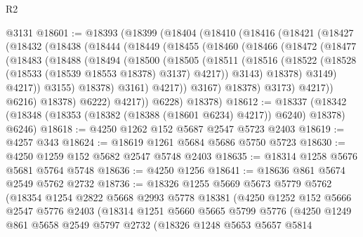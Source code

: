 \begin{lexlean}{R2}
\begin{coremodule}
    @3131
@18601 := @18393
    (@18399
      (@18404
        (@18410
          (@18416
            (@18421
              (@18427
                (@18432
                  (@18438
                    (@18444
                      (@18449
                        (@18455
                          (@18460
                            (@18466
                              (@18472
                                (@18477
                                  (@18483
                                    (@18488
                                      (@18494
                                        (@18500
                                          (@18505
                                            (@18511
                                              (@18516
                                                (@18522
                                                  (@18528
                                                    (@18533 (@18539 @18553 @18378) @3137)
                                                    @4217))
                                                @3143)
                                              @18378)
                                            @3149)
                                          @4217))
                                      @3155)
                                    @18378)
                                  @3161)
                                @4217))
                            @3167)
                          @18378)
                        @3173)
                      @4217))
                  @6216)
                @18378)
              @6222)
            @4217))
        @6228)
      @18378)
@18612 := @18337
    (@18342 (@18348 (@18353 (@18382 (@18388 (@18601 @6234) @4217)) @6240) @18378) @6246)
@18618 := @4250 @1262 @152 @5687 @2547 @5723 @2403
@18619 := @4257 @343
@18624 := @18619 @1261 @5684 @5686 @5750 @5723
@18630 := @4250 @1259 @152 @5682 @2547 @5748 @2403
@18635 := @18314 @1258 @5676 @5681 @5764 @5748
@18636 := @4250 @1256
@18641 := @18636 @861 @5674 @2549 @5762 @2732
@18736 := @18326
    @1255
    @5669
    @5673
    @5779
    @5762
    (@18354
      @1254
      @2822
      @5668
      @2993
      @5778
      @18381
      (@4250
        @1252
        @152
        @5666
        @2547
        @5776
        @2403
        (@18314
          @1251
          @5660
          @5665
          @5799
          @5776
          (@4250
            @1249
            @861
            @5658
            @2549
            @5797
            @2732
            (@18326
              @1248
              @5653
              @5657
              @5814

\end{coremodule}
\end{lexlean}
